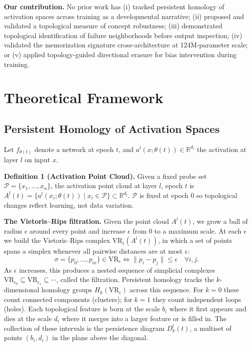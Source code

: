 \documentclass[10pt]{article}
\begin{document}
\textbf{Our contribution.} No prior work has (i) tracked persistent homology of activation spaces across training as a developmental narrative; (ii) proposed and validated a topological measure of concept robustness; (iii) demonstrated topological identification of failure neighborhoods before output inspection; (iv) validated the memorization signature cross-architecture at 124M-parameter scale; or (v) applied topology-guided directional erasure for bias intervention during training.

\section{Theoretical Framework}

\subsection{Persistent Homology of Activation Spaces}

Let $f_{\theta(t)}$ denote a network at epoch $t$, and $a^{l}(x;\theta(t))\in\mathbb{R}^{d_l}$ the activation at layer $l$ on input $x$.

\textbf{Definition 1 (Activation Point Cloud).} Given a fixed probe set $\mathcal{P}=\{x_1,\dots,x_n\}$, the activation point cloud at layer $l$, epoch $t$ is $A^{l}(t)=\{a^{l}(x_i;\theta(t)) \mid x_i\in\mathcal{P}\}\subset\mathbb{R}^{d_l}$. $\mathcal{P}$ is fixed at epoch 0 so topological changes reflect learning, not data variation.

\textbf{The Vietoris--Rips filtration.} Given the point cloud $A^{l}(t)$, we grow a ball of radius $\epsilon$ around every point and increase $\epsilon$ from 0 to a maximum scale. At each $\epsilon$ we build the Vietoris--Rips complex $\mathrm{VR}_{\epsilon}(A^{l}(t))$, in which a set of points spans a simplex whenever all pairwise distances are at most $\epsilon$:
\[
\sigma=\{p_0,\dots,p_m\}\in \mathrm{VR}_{\epsilon} \iff \|p_i-p_j\|\le\epsilon \quad \forall i,j.
\]
As $\epsilon$ increases, this produces a nested sequence of simplicial complexes $\mathrm{VR}_{\epsilon_0}\subseteq \mathrm{VR}_{\epsilon_1}\subseteq\cdots$, called the filtration. Persistent homology tracks the $k$-dimensional homology groups $H_k(\mathrm{VR}_{\epsilon})$ across this sequence. For $k=0$ these count connected components (clusters); for $k=1$ they count independent loops (holes). Each topological feature is born at the scale $b_i$ where it first appears and dies at the scale $d_i$ where it merges into a larger feature or is filled in. The collection of these intervals is the persistence diagram $D^{l}_{k}(t)$, a multiset of points $(b_i,d_i)$ in the plane above the diagonal.
\end{document}
